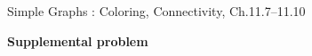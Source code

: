 \documentclass[handout]{mcs}
\begin{document}

\begin{staffnotes}
Simple Graphs : Coloring, Connectivity, Ch.11.7--11.10
\end{staffnotes}


\begin{center}
\textbf{\large Supplemental problem}
\end{center}


\end{document}
